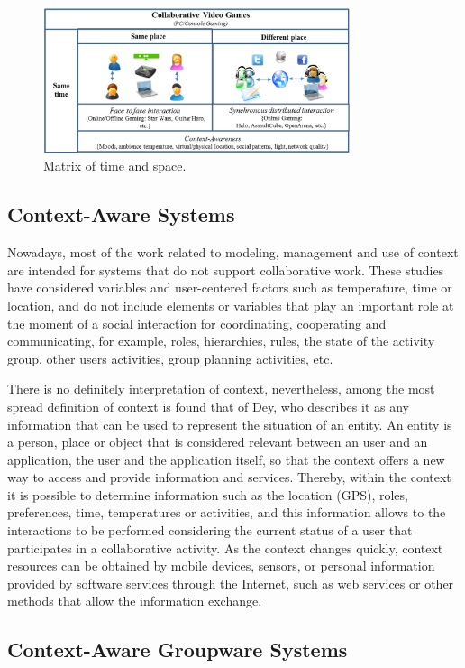 \documentclass[conference]{./sty/IEEEtran}
\begin{document}
\begin{figure}[ht!]
	\centering
	\includegraphics[width=9cm]{images/matrix.png}
	\caption{Matrix of time and space.} %
	\label{fig:matrix}
\end{figure}

\subsection{Context-Aware Systems}
Nowadays, most of the work related to modeling, management and use of context are intended for systems that do not support collaborative work. These studies have considered variables and user-centered factors such as temperature, time or location, and do not include elements or variables that play an important role at the moment of a social interaction for coordinating, cooperating and communicating, for example, roles, hierarchies, rules, the state of the activity group, other users activities, group planning activities, etc.

There is no definitely interpretation of context, nevertheless, among the most spread definition of context is found that of Dey\cite{Dey01}, who describes it as any information that can be used to represent the situation of an entity. An entity is a person, place or object that is considered relevant between an user and an application, the user and the application itself, so that the context offers a new way to access and provide information and services. Thereby, within the context it is possible to determine information such as the location (GPS), roles, preferences, time, temperatures or activities, and this information allows to the interactions to be performed considering the current status of a user that participates in a collaborative activity. As the context changes quickly, context resources can be obtained by mobile devices, sensors, or personal information provided by software services through the Internet, such as web services or other methods that allow the information exchange.


\subsection{Context-Aware Groupware Systems}
\end{document}
